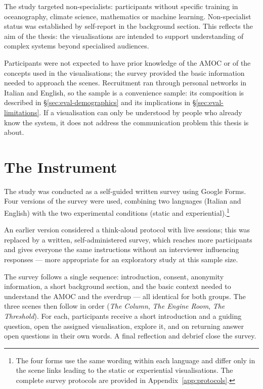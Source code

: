 The study targeted non-specialists: participants without specific training in oceanography, climate science, mathematics or machine learning. Non-specialist status was established by self-report in the background section. This reflects the aim of the thesis: the visualisations are intended to support understanding of complex systems beyond specialised audiences.

Participants were not expected to have prior knowledge of the AMOC or of the concepts used in the visualisations; the survey provided the basic information needed to approach the scenes. Recruitment ran through personal networks in Italian and English, so the sample is a convenience sample: its composition is described in \S\ref{sec:eval-demographics} and its implications in \S\ref{sec:eval-limitations}. If a visualisation can only be understood by people who already know the system, it does not address the communication problem this thesis is about.

\section{The Instrument}
\label{sec:eval-instrument}

The study was conducted as a self-guided written survey using Google Forms. Four versions of the survey were used, combining two languages (Italian and English) with the two experimental conditions (static and experiential).\footnote{The four forms use the same wording within each language and differ only in the scene links leading to the static or experiential visualisations. The complete survey protocols are provided in Appendix~\ref{app:protocols}.}



An earlier version considered a think-aloud protocol with live sessions; this was replaced by a written, self-administered survey, which reaches more participants and gives everyone the same instructions without an interviewer influencing responses --- more appropriate for an exploratory study at this sample size.

The survey follows a single sequence: introduction, consent, anonymity information, a short background section, and the basic context needed to understand the AMOC and the sverdrup --- all identical for both groups. The three scenes then follow in order (\textit{The Column}, \textit{The Engine Room}, \textit{The Threshold}). For each, participants receive a short introduction and a guiding question, open the assigned visualisation, explore it, and on returning answer open questions in their own words. A final reflection and debrief close the survey.

